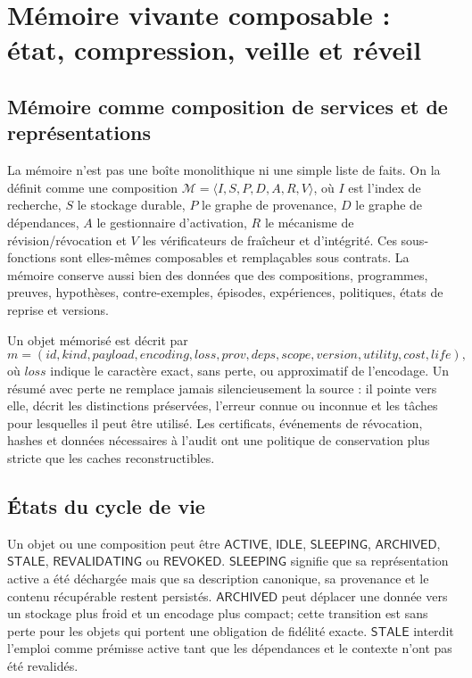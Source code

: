 \documentclass[11pt,a4paper]{article}
\theoremstyle{definition}
\theoremstyle{plain}
\theoremstyle{remark}
\begin{document}
\section{Mémoire vivante composable : état, compression, veille et réveil}
\subsection{Mémoire comme composition de services et de représentations}
La mémoire n'est pas une boîte monolithique ni une simple liste de faits. On la définit comme une composition \(\mathcal{M}=\langle I,S,P,D,A,R,V\rangle\), où \(I\) est l'index de recherche, \(S\) le stockage durable, \(P\) le graphe de provenance, \(D\) le graphe de dépendances, \(A\) le gestionnaire d'activation, \(R\) le mécanisme de révision/révocation et \(V\) les vérificateurs de fraîcheur et d'intégrité. Ces sous-fonctions sont elles-mêmes composables et remplaçables sous contrats. La mémoire conserve aussi bien des données que des compositions, programmes, preuves, hypothèses, contre-exemples, épisodes, expériences, politiques, états de reprise et versions.

Un objet mémorisé est décrit par
\[
m=(id,kind,payload,encoding,loss,prov,deps,scope,version,utility,cost,life),
\]
où \(loss\) indique le caractère exact, sans perte, ou approximatif de l'encodage. Un résumé avec perte ne remplace jamais silencieusement la source : il pointe vers elle, décrit les distinctions préservées, l'erreur connue ou inconnue et les tâches pour lesquelles il peut être utilisé. Les certificats, événements de révocation, hashes et données nécessaires à l'audit ont une politique de conservation plus stricte que les caches reconstructibles.

\subsection{États du cycle de vie}
Un objet ou une composition peut être \(\mathsf{ACTIVE}\), \(\mathsf{IDLE}\), \(\mathsf{SLEEPING}\), \(\mathsf{ARCHIVED}\), \(\mathsf{STALE}\), \(\mathsf{REVALIDATING}\) ou \(\mathsf{REVOKED}\). \(\mathsf{SLEEPING}\) signifie que sa représentation active a été déchargée mais que sa description canonique, sa provenance et le contenu récupérable restent persistés. \(\mathsf{ARCHIVED}\) peut déplacer une donnée vers un stockage plus froid et un encodage plus compact; cette transition est sans perte pour les objets qui portent une obligation de fidélité exacte. \(\mathsf{STALE}\) interdit l'emploi comme prémisse active tant que les dépendances et le contexte n'ont pas été revalidés.
\end{document}
